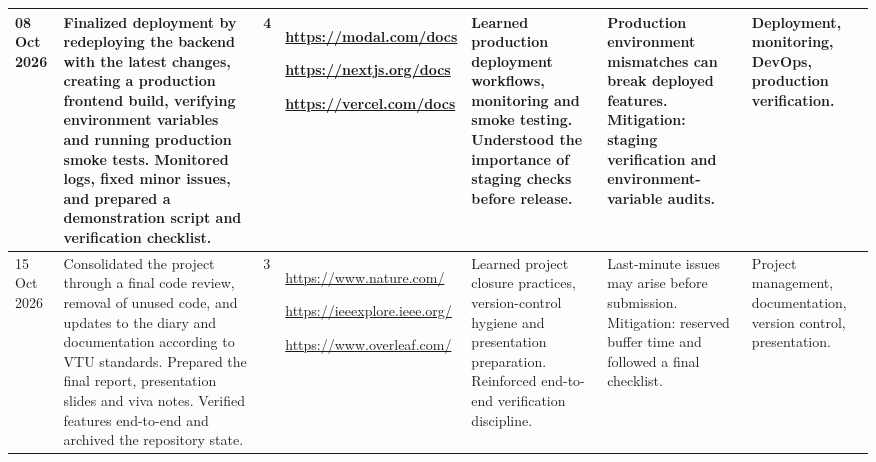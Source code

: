 \documentclass[8pt,a4paper]{article}
\begin{document}
\begin{longtable}{|
    D{1.25cm}|
    D{4.10cm}|
    D{0.70cm}|
    D{2.90cm}|
    D{2.90cm}|
    D{3.00cm}|
    D{2.95cm}|
}
08 Oct 2026 &
Finalized deployment by redeploying the backend with the latest changes, creating a production frontend build, verifying environment variables and running production smoke tests. Monitored logs, fixed minor issues, and prepared a demonstration script and verification checklist. &
4 &
\url{https://modal.com/docs}
\par
\url{https://nextjs.org/docs}
\par
\url{https://vercel.com/docs}
&
Learned production deployment workflows, monitoring and smoke testing. Understood the importance of staging checks before release. &
Production environment mismatches can break deployed features. Mitigation: staging verification and environment-variable audits. &
Deployment, monitoring, DevOps, production verification. \\
\hline

15 Oct 2026 &
Consolidated the project through a final code review, removal of unused code, and updates to the diary and documentation according to VTU standards. Prepared the final report, presentation slides and viva notes. Verified features end-to-end and archived the repository state. &
3 &
\url{https://www.nature.com/}
\par
\url{https://ieeexplore.ieee.org/}
\par
\url{https://www.overleaf.com/}
&
Learned project closure practices, version-control hygiene and presentation preparation. Reinforced end-to-end verification discipline. &
Last-minute issues may arise before submission. Mitigation: reserved buffer time and followed a final checklist. &
Project management, documentation, version control, presentation. \\
\hline


\end{longtable}
\end{document}

